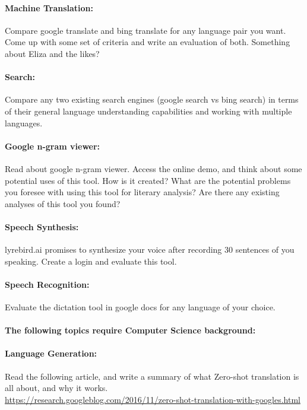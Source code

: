 \documentclass[11pt,a4paper]{article}
\begin{document}
\paragraph{Machine Translation: } Compare google translate and bing translate for any language pair you want. Come up with some set of criteria and write an evaluation of both. 
Something about Eliza and the likes? 

\paragraph{Search: } Compare any two existing search engines (google search vs bing search) in terms of their general language understanding capabilities and working with multiple languages.

\paragraph{Google n-gram viewer: } Read about google n-gram viewer. Access the online demo, and think about some potential uses of this tool. How is it created? What are the potential problems you foresee with using this tool for literary analysis? Are there any existing analyses of this tool you found? 

\paragraph{Speech Synthesis: } lyrebird.ai promises to synthesize your voice after recording 30 sentences of you speaking. Create a login and evaluate this tool. 

\paragraph{Speech Recognition: } Evaluate the dictation tool in google docs for any language of your choice.


\paragraph{The following topics require Computer Science background: }

\paragraph{Language Generation:} Read the following article, and write a summary of what Zero-shot translation is all about, and why it works. \\ 
\url{https://research.googleblog.com/2016/11/zero-shot-translation-with-googles.html} 
\end{document}
